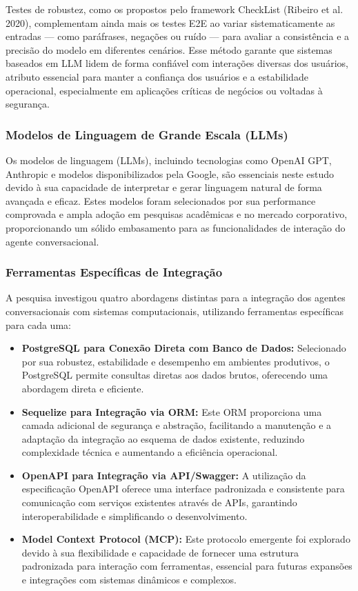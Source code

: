 \documentclass[
]{article}
\begin{document}
Testes de robustez, como os propostos pelo framework CheckList (Ribeiro
et al. 2020), complementam ainda mais os testes E2E ao variar
sistematicamente as entradas --- como paráfrases, negações ou ruído ---
para avaliar a consistência e a precisão do modelo em diferentes
cenários. Esse método garante que sistemas baseados em LLM lidem de
forma confiável com interações diversas dos usuários, atributo essencial
para manter a confiança dos usuários e a estabilidade operacional,
especialmente em aplicações críticas de negócios ou voltadas à
segurança.

\subsubsection{Modelos de Linguagem de Grande Escala
(LLMs)}\label{modelos-de-linguagem-de-grande-escala-llms}

Os modelos de linguagem (LLMs), incluindo tecnologias como OpenAI GPT,
Anthropic e modelos disponibilizados pela Google, são essenciais neste
estudo devido à sua capacidade de interpretar e gerar linguagem natural
de forma avançada e eficaz. Estes modelos foram selecionados por sua
performance comprovada e ampla adoção em pesquisas acadêmicas e no
mercado corporativo, proporcionando um sólido embasamento para as
funcionalidades de interação do agente conversacional.

\subsubsection{Ferramentas Específicas de
Integração}\label{ferramentas-especuxedficas-de-integrauxe7uxe3o}

A pesquisa investigou quatro abordagens distintas para a integração dos
agentes conversacionais com sistemas computacionais, utilizando
ferramentas específicas para cada uma:

\begin{itemize}
\item
  \textbf{PostgreSQL para Conexão Direta com Banco de Dados:}
  Selecionado por sua robustez, estabilidade e desempenho em ambientes
  produtivos, o PostgreSQL permite consultas diretas aos dados brutos,
  oferecendo uma abordagem direta e eficiente.
\item
  \textbf{Sequelize para Integração via ORM:} Este ORM proporciona uma
  camada adicional de segurança e abstração, facilitando a manutenção e
  a adaptação da integração ao esquema de dados existente, reduzindo
  complexidade técnica e aumentando a eficiência operacional.
\item
  \textbf{OpenAPI para Integração via API/Swagger:} A utilização da
  especificação OpenAPI oferece uma interface padronizada e consistente
  para comunicação com serviços existentes através de APIs, garantindo
  interoperabilidade e simplificando o desenvolvimento.
\item
  \textbf{Model Context Protocol (MCP):} Este protocolo emergente foi
  explorado devido à sua flexibilidade e capacidade de fornecer uma
  estrutura padronizada para interação com ferramentas, essencial para
  futuras expansões e integrações com sistemas dinâmicos e complexos.
\end{itemize}
\end{document}

